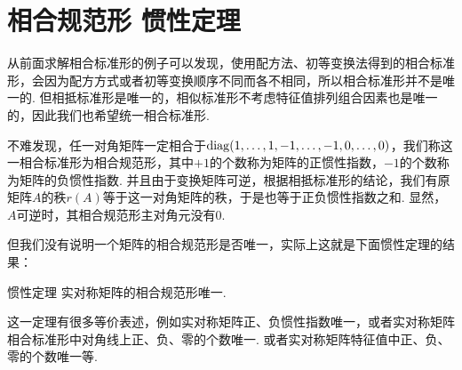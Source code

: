 \section{相合规范形 \quad 惯性定理}

从前面求解相合标准形的例子可以发现，使用配方法、初等变换法得到的相合标准形，会因为配方方式或者初等变换顺序不同而各不相同，所以相合标准形并不是唯一的. 但相抵标准形是唯一的，相似标准形不考虑特征值排列组合因素也是唯一的，因此我们也希望统一相合标准形.

不难发现，任一对角矩阵一定相合于$\operatorname{diag}(1,\ldots,1,-1,\ldots,-1,0,\ldots,0)$，我们称这一相合标准形为相合规范形，其中$+1$的个数称为矩阵的正惯性指数，$-1$的个数称为矩阵的负惯性指数. 并且由于变换矩阵可逆，根据相抵标准形的结论，我们有原矩阵$A$的秩$r(A)$等于这一对角矩阵的秩，于是也等于正负惯性指数之和. 显然，$A$可逆时，其相合规范形主对角元没有0.

但我们没有说明一个矩阵的相合规范形是否唯一，实际上这就是下面惯性定理的结果：
\begin{theorem}{惯性定理}{}
    实对称矩阵的相合规范形唯一.
\end{theorem}
这一定理有很多等价表述，例如实对称矩阵正、负惯性指数唯一，或者实对称矩阵相合标准形中对角线上正、负、零的个数唯一. 或者实对称矩阵特征值中正、负、零的个数唯一等.

